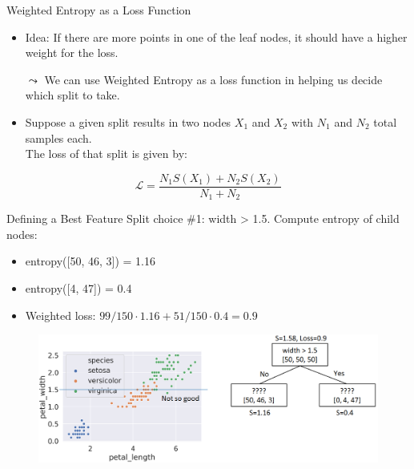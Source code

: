 \documentclass[aspectratio=169]{../latex_main/tntbeamer}  %
\begin{document}
	
	\begin{frame}[c]{Weighted Entropy as a Loss Function}
	
	    \begin{itemize}
	        \item Idea: If there are more points in one of the leaf nodes, it should have a higher weight for the loss.
	        \item[$\leadsto$] We can use \alert{Weighted Entropy} as a loss function in helping us decide which split to take.
	        \item Suppose a given split results in two nodes $X_1$ and $X_2$ with $N_1$ and $N_2$ total samples each.\\ The loss of that split is given by:
	    \end{itemize}
	    
	    \begin{equation*}
	        \mathcal{L}=\frac{N_1S(X_1) + N_2S(X_2)}{N_1 + N_2}
	    \end{equation*}
	\end{frame}
	
	\begin{frame}{Defining a Best Feature}
	    Split choice \#1: width > 1.5. Compute entropy of child nodes:
	    \begin{itemize}
	        \item entropy([50, 46, 3]) = 1.16
	        \item entropy([4, 47]) = 0.4
	        \item Weighted loss: $99/150 \cdot 1.16 + 51/150 \cdot 0.4 = 0.9$
	    \end{itemize}
	    
	    \begin{figure}
	        \centering
	        \includegraphics[scale=.4]{Bild48}
	    \end{figure}
	\end{frame}
	
\end{document}
